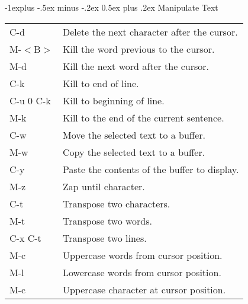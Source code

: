 \documentclass[10pt,landscape]{article}
\makeatletter
\renewcommand{\subsection}{\@startsection{subsection}{2}{0mm}%
				{-1explus -.5ex minus -.2ex}%
				{0.5ex plus .2ex}%
				{\normalfont\normalsize\bfseries}}
\makeatother
\begin{document}
\begin{multicols}{3}
\subsection{Manipulate Text}
\begin{tabular}{@{}ll@{}}
  {C-d} & Delete the next character after the cursor.\\
  {M-$<$B$>$} & Kill the word previous to the cursor.\\
  {M-d} & Kill the next word after the cursor.\\
  {C-k} & Kill to end of line.\\
  {C-u 0 C-k} & Kill to beginning of line.\\
  {M-k} & Kill to the end of the current sentence.\\
  {C-w} & Move the selected text to a buffer.\\
  {M-w} & Copy the selected text to a buffer.\\
  {C-y} & Paste the contents of the buffer to display.\\
  {M-z} & Zap until character.\\
  {C-t} & Transpose two characters.\\
  {M-t} & Transpose two words.\\
  {C-x C-t} & Transpose two lines.\\
  {M-c} & Uppercase words from cursor position.\\
  {M-l} & Lowercase words from cursor position.\\
  {M-c} & Uppercase character at cursor position.\\
\end{tabular}

\end{multicols}
\end{document}
